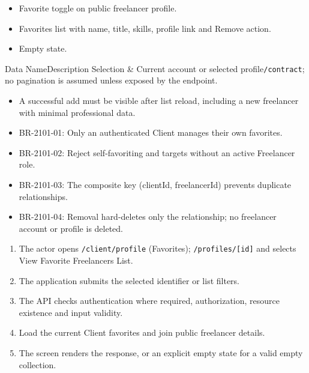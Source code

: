 \begin{itemize}[leftmargin=1.6em,topsep=3pt,itemsep=2pt,parsep=0pt,label=$\bullet$]
    \item Favorite toggle on public freelancer profile.
    \item Favorites list with name, title, skills, profile link and Remove action.
    \item Empty state.
\end{itemize}


\begin{specdatatable}{Data Name}{Description}
Selection & Current account or selected profile\texttt{/\allowbreak{}contract}; no pagination is assumed unless exposed by the endpoint.\\ \hline
\end{specdatatable}

\begin{itemize}[leftmargin=1.6em,topsep=3pt,itemsep=2pt,parsep=0pt,label=$\bullet$]
    \item A successful add must be visible after list reload, including a new freelancer with minimal professional data.
\end{itemize}

\begin{itemize}[leftmargin=1.6em,topsep=3pt,itemsep=2pt,parsep=0pt,label=$\bullet$]\brrulelist
    \item BR-2101-01: Only an authenticated Client manages their own favorites.
    \item BR-2101-02: Reject self-favoriting and targets without an active Freelancer role.
    \item BR-2101-03: The composite key (clientId, freelancerId) prevents duplicate relationships.
    \item BR-2101-04: Removal hard-deletes only the relationship; no freelancer account or profile is deleted.
\end{itemize}

\begin{enumerate}[leftmargin=1.8em,topsep=3pt,itemsep=2pt,parsep=0pt]
    \item The actor opens \texttt{/\allowbreak{}client/\allowbreak{}profile} (Favorites); \texttt{/\allowbreak{}profiles/\allowbreak{}[id]} and selects View Favorite Freelancers List.
    \item The application submits the selected identifier or list filters.
    \item The API checks authentication where required, authorization, resource existence and input validity.
    \item Load the current Client favorites and join public freelancer details.
    \item The screen renders the response, or an explicit empty state for a valid empty collection.
\end{enumerate}

